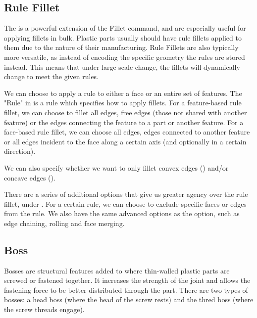 \subsection{Rule Fillet}



The  is a powerful extension of the Fillet command, and are especially useful for applying fillets in bulk. Plastic parts usually should have rule fillets applied to them due to the nature of their manufacturing. Rule Fillets are also typically more versatile, as instead of encoding the specific geometry the rules are stored instead. This means that under large scale change, the fillets will dynamically change to meet the given rules.

We can choose to apply a rule to either a face or an entire set of features. The "Rule" in  is a rule which specifies how to apply fillets. For a feature-based rule fillet, we can choose to fillet all edges, free edges (those not shared with another feature) or the edges connecting the feature to a part or another feature. For a face-based rule fillet, we can choose all edges, edges connected to another feature or all edges incident to the face along a certain axis (and optionally in a certain direction).

We can also specify whether we want to only fillet convex edges () and/or concave edges ().

There are a series of additional options that give us greater agency over the rule fillet, under \appcommand{$>>$}. For a certain rule, we can choose to exclude specific faces or edges from the rule. We also have the same advanced options as the  option, such as edge chaining, rolling and face merging.

\subsection{Boss}



Bosses are structural features added to where thin-walled plastic parts are screwed or fastened together. It increases the strength of the joint and allows the fastening force to be better distributed through the part. There are two types of bosses: a head boss (where the head of the screw rests) and the thred boss (where the screw threads engage).

